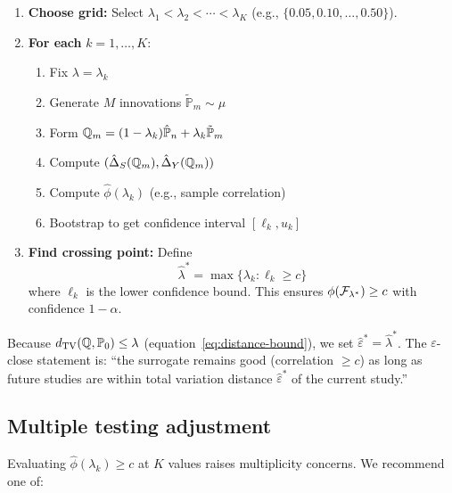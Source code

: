 \documentclass{article}
\newcommand{\PP}{\mathbb{P}}
\begin{document}
\begin{enumerate}
    \item \textbf{Choose grid:} Select $\lambda_1 < \lambda_2 < \cdots < \lambda_K$
          (e.g., $\{0.05, 0.10, \ldots, 0.50\}$).

    \item \textbf{For each} $k = 1, \ldots, K$:
          \begin{enumerate}
              \item Fix $\lambda = \lambda_k$
              \item Generate $M$ innovations $\tilde{\PP}_m \sim \mu$
              \item Form $\Q_m = (1-\lambda_k)\hat{\PP}_n + \lambda_k\tilde{\PP}_m$
              \item Compute $(\hat{\Delta}_S(\mathbb{Q}_m), \hat{\Delta}_Y(\mathbb{Q}_m))$
              \item Compute $\hat{\phi}(\lambda_k)$ (e.g., sample correlation)
              \item Bootstrap to get confidence interval $[\ell_k, u_k]$
          \end{enumerate}

    \item \textbf{Find crossing point:} Define
          \[
              \hat{\lambda}^* = \max\{\lambda_k : \ell_k \geq c\}
          \]
          where $\ell_k$ is the lower confidence bound. This ensures
          $\phi(\mathcal{F}_{\lambda^*}) \geq c$ with confidence $1-\alpha$.
\end{enumerate}

Because $d_{\mathrm{TV}}(\Q, \PP_0) \leq \lambda$ (equation~\eqref{eq:distance-bound}),
we set $\hat{\varepsilon}^* = \hat{\lambda}^*$. The $\varepsilon$-close statement is:
``the surrogate remains good (correlation $\geq c$) as long as future studies are
within total variation distance $\hat{\varepsilon}^*$ of the current study.''

\subsection{Multiple testing adjustment}

Evaluating $\hat{\phi}(\lambda_k) \geq c$ at $K$ values raises multiplicity concerns.
We recommend one of:
\end{document}
